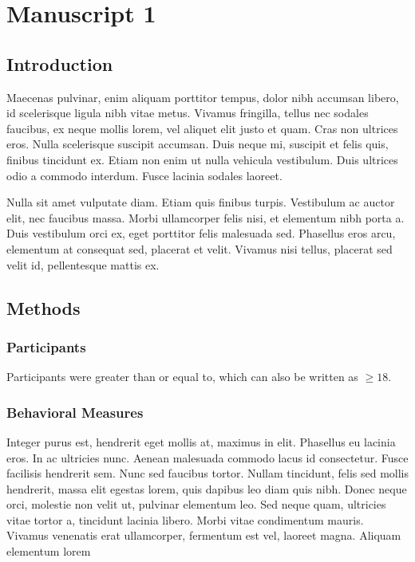 \chapter{Manuscript 1}\label{chap:manuscript_1}


\section{Introduction}

Maecenas pulvinar, enim aliquam porttitor tempus, dolor nibh accumsan libero, id scelerisque ligula nibh vitae metus. Vivamus fringilla, tellus nec sodales faucibus, ex neque mollis lorem, vel aliquet elit justo et quam. Cras non ultrices eros. Nulla scelerisque suscipit accumsan. Duis neque mi, suscipit et felis quis, finibus tincidunt ex. Etiam non enim ut nulla vehicula vestibulum. Duis ultrices odio a commodo interdum. Fusce lacinia sodales laoreet.

Nulla sit amet vulputate diam. Etiam quis finibus turpis. Vestibulum ac auctor elit, nec faucibus massa. Morbi ullamcorper felis nisi, et elementum nibh porta a. Duis vestibulum orci ex, eget porttitor felis malesuada sed. Phasellus eros arcu, elementum at consequat sed, placerat et velit. Vivamus nisi tellus, placerat sed velit id, pellentesque mattis ex.

\section{Methods}

\subsection*{Participants}

Participants were greater than or equal to, which can also be written as $\geq 18$.

\subsection*{Behavioral Measures}

Integer purus est, hendrerit eget mollis at, maximus in elit. Phasellus eu lacinia eros. In ac ultricies nunc. Aenean malesuada commodo lacus id consectetur. Fusce facilisis hendrerit sem. Nunc sed faucibus tortor. Nullam tincidunt, felis sed mollis hendrerit, massa elit egestas lorem, quis dapibus leo diam quis nibh. Donec neque orci, molestie non velit ut, pulvinar elementum leo. Sed neque quam, ultricies vitae tortor a, tincidunt lacinia libero. Morbi vitae condimentum mauris. Vivamus venenatis erat ullamcorper, fermentum est vel, laoreet magna. Aliquam elementum lorem

